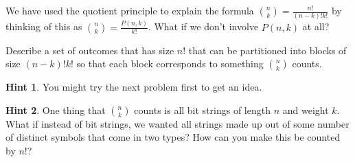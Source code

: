 \documentclass{book}
\begin{document}
\setcounter{cpjt}{114}
\addtocounter{cpjt}{-1}
\begin{activity}\label{activity-107}
\hypertarget{p-782}{}%
We have used the quotient principle to explain the formula \(\binom{n}{k} = \frac{n!}{(n-k)!k!}\) by thinking of this as \(\binom{n}{k} = \frac{P(n,k)}{k!}\).  What if we don't involve \(P(n,k)\) at all?%
\par
\hypertarget{p-783}{}%
Describe a set of outcomes that has size \(n!\) that can be partitioned into blocks of size \((n-k)!k!\) so that each block corresponds to something \(\binom{n}{k}\) counts.%
\par\smallskip%
\noindent\textbf{Hint 1}.\hypertarget{hint-70}{}\quad%
\hypertarget{p-784}{}%
You might try the next problem first to get an idea.%
\par\smallskip%
\noindent\textbf{Hint 2}.\hypertarget{hint-71}{}\quad%
\hypertarget{p-785}{}%
One thing that \(\binom{n}{k}\) counts is all bit strings of length \(n\) and weight \(k\).  What if instead of bit strings, we wanted all strings made up out of some number of distinct symbols that come in two types?  How can you make this be counted by \(n!\)?%
\end{activity}

\clearpage
\end{document}
